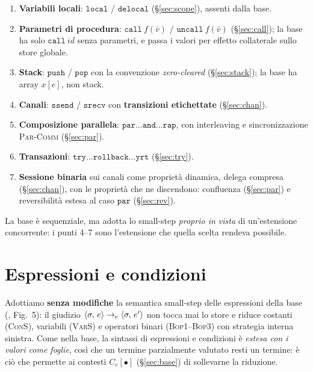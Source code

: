 \begin{enumerate}
\item \textbf{Variabili locali}: $\mathtt{local}$ / $\mathtt{delocal}$
  (\S\ref{sec:scope}), assenti dalla base.
\item \textbf{Parametri di procedura}: $\mathtt{call}\ f(\bar v)$ /
  $\mathtt{uncall}\ f(\bar v)$ (\S\ref{sec:call}); la base ha solo
  $\mathtt{call}\ \mathit{id}$ senza parametri, e passa i valori per effetto
  collaterale sullo store globale.
\item \textbf{Stack}: $\mathtt{push}$ / $\mathtt{pop}$ con la convenzione
  \emph{zero-cleared} (\S\ref{sec:stack}); la base ha array $x[e]$, non stack.
\item \textbf{Canali}: $\mathtt{ssend}$ / $\mathtt{srecv}$ con
  \textbf{transizioni etichettate} (\S\ref{sec:chan}).
\item \textbf{Composizione parallela}: $\mathtt{par}\ldots\mathtt{and}\ldots
  \mathtt{rap}$, con interleaving e sincronizzazione \textsc{Par-Comm}
  (\S\ref{sec:par}).
\item \textbf{Transazioni}: $\mathtt{try}\ldots\mathtt{rollback}\ldots
  \mathtt{yrt}$ (\S\ref{sec:try}).
\item \textbf{Sessione binaria} sui canali come proprietà dinamica, delega
  compresa (\S\ref{sec:chan}), con le proprietà che ne discendono: confluenza
  (\S\ref{sec:par}) e reversibilità estesa al caso $\mathtt{par}$
  (\S\ref{sec:rev}).
\end{enumerate}

\noindent
La base è sequenziale, ma adotta lo small-step \emph{proprio in vista} di
un'estensione concorrente: i punti 4--7 sono l'estensione che quella scelta
rendeva possibile.

\section{Espressioni e condizioni}
\label{sec:esp}

Adottiamo \textbf{senza modifiche} la semantica small-step delle espressioni
della base (\cite{LamiLaneseStefani2024}, Fig.~5): il giudizio
$\langle \sigma,\, e \rangle \to_e \langle \sigma,\, e' \rangle$ non tocca mai lo store e riduce
costanti (\textsc{ConS}), variabili (\textsc{VarS}) e operatori binari
(\textsc{Bop1}--\textsc{Bop3}) con strategia interna sinistra. Come nella
base, la sintassi di espressioni e condizioni è \emph{estesa con i valori come
foglie}, così che un termine parzialmente valutato resti un termine: è ciò
che permette ai contesti $C_e[\bullet]$ (\S\ref{sec:base}) di sollevarne la
riduzione.

